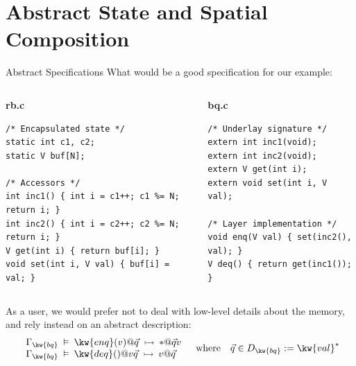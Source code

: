 \documentclass[aspectratio=1610,12pt]{beamer}
\begin{document}
\section{Abstract State and Spatial Composition}

\begin{frame}[fragile]{Abstract Specifications} %
  What would be a good specification for our example:

  \vspace{1ex}
  \begin{columns}
    \scriptsize
    \begin{column}{0.45\textwidth}
\textbf{rb.c}
\begin{verbatim}
/* Encapsulated state */
static int c1, c2;
static V buf[N];

/* Accessors */
int inc1() { int i = c1++; c1 %= N; return i; }
int inc2() { int i = c2++; c2 %= N; return i; }
V get(int i) { return buf[i]; }
void set(int i, V val) { buf[i] = val; }
\end{verbatim}
    \end{column}
    \begin{column}{0.45\textwidth}
\textbf{bq.c}
\begin{verbatim}
/* Underlay signature */
extern int inc1(void);
extern int inc2(void);
extern V get(int i);
extern void set(int i, V val);

/* Layer implementation */
void enq(V val) { set(inc2(), val); }
V deq() { return get(inc1()); }
\end{verbatim}
    \end{column}
  \end{columns}

  \vfill
  As a user,
  we would prefer not to deal with low-level details about the memory,
  and rely instead on an abstract description:
\[
  \begin{array}{l}
    \Gamma_\kw{bq} \:\vDash\:
      \kw{enq}(v) @ \vec{q}
      \:\rightarrowtail\:
      {*} @ \vec{q}v
    \\
    \Gamma_\kw{bq} \:\vDash\:
      \kw{deq}() @ v\vec{q}
      \:\rightarrowtail\:
      v @ \vec{q}
  \end{array}
  \quad \text{where} \quad
  \vec{q} \in D_\kw{bq} := \kw{val}^*
\]
\end{frame}
\end{document}
